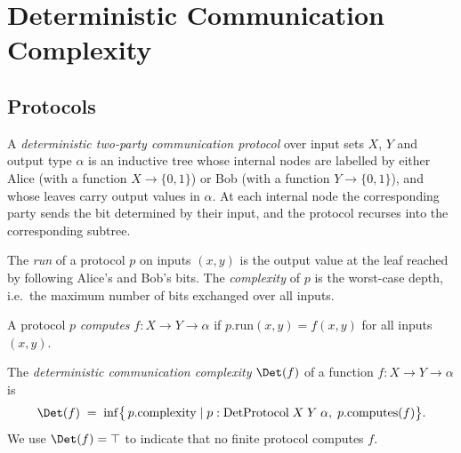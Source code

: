 \chapter{Deterministic Communication Complexity}

\section{Protocols}

\begin{definition}
  \label{def:det_protocol}
  \leanok
  A \emph{deterministic two-party communication protocol} over input sets $X$, $Y$
  and output type $\alpha$ is an inductive tree whose internal nodes are labelled
  by either Alice (with a function $X \to \{0,1\}$) or Bob (with a function
  $Y \to \{0,1\}$), and whose leaves carry output values in $\alpha$.
  At each internal node the corresponding party sends the bit determined by their
  input, and the protocol recurses into the corresponding subtree.
\end{definition}

\begin{definition}
  \label{def:protocol_run}
  \leanok
  \leanok
  The \emph{run} of a protocol $p$ on inputs $(x, y)$ is the output value at the
  leaf reached by following Alice's and Bob's bits.
  The \emph{complexity} of $p$ is the worst-case depth, i.e.\ the maximum number
  of bits exchanged over all inputs.
\end{definition}

\begin{definition}[Computes]
  \label{def:computes}
  \leanok
  A protocol $p$ \emph{computes} $f : X \to Y \to \alpha$ if $p.\mathrm{run}(x,y)
  = f(x,y)$ for all inputs $(x,y)$.
\end{definition}

\begin{definition}
  \label{def:det_cc}
  \leanok
  The \emph{deterministic communication complexity} $\Det(f)$ of a function
  $f : X \to Y \to \alpha$ is
  \[
    \Det(f) \;=\; \inf \bigl\{\, p.\mathrm{complexity} \mid
      p : \text{DetProtocol}\;X\;Y\;\alpha,\; p.\mathrm{computes}(f) \bigr\}.
  \]
  We use $\Det(f) = \top$ to indicate that no finite protocol computes $f$.
\end{definition}

